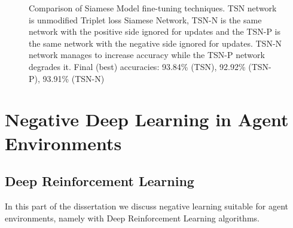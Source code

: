 \documentclass[b5paper]{book}
\begin{document}
\begin{figure}
    \centering
    \caption{Comparison of Siamese Model fine-tuning techniques. TSN network is unmodified Triplet loss Siamese Network, TSN-N is the same network with the positive side ignored for updates and the TSN-P is the same network with the negative side ignored for updates. TSN-N network manages to increase accuracy while the TSN-P network degrades it. Final (best) accuracies: 93.84\% (TSN), 92.92\% (TSN-P), 93.91\% (TSN-N)}
    \label{fig:snn_chart}
\end{figure}



\part{Negative Deep Learning in Agent Environments}

\chapter{Deep Reinforcement Learning}

In this part of the dissertation we discuss negative learning suitable for agent environments, namely with Deep Reinforcement Learning algorithms.
\end{document}
